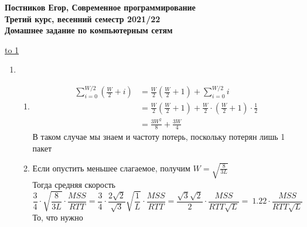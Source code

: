 \documentclass[12pt]{article}
\def\up{\vspace*{-0.3em}}
\def\LINE{\vspace*{-1em}\noindent \underline{\hbox to 1\textwidth{{ } \hfil{ } \hfil{ } }}}
\newenvironment{MyList}[1][4pt]{
  \begin{enumerate}[1.]
  \setlength{\parskip}{0pt}
  \setlength{\itemsep}{#1}
}{       
  \end{enumerate}
}
\begin{document}
\renewcommand{\dateseparator}{--}
\begin{center}
  {\Large\bf 
 	Постников Егор, Современное программирование\\ 	
   Третий курс, весенний семестр 2021/22\\
   Домашнее задание по компьютерным сетям
   }\\
  \vspace{0.5em}
\end{center}

\vspace{-1em}
\LINE
\vspace{1em}

\vspace*{0.5em}

\up

\begin{MyList}
	\item \begin{enumerate}
		\item \begin{align*}
			\sum_{i = 0}^{W / 2} \left(\frac{W}{2} + i\right) 
			&= \frac{W}{2}\left(\frac{W}{2} + 1\right) + \sum_{i = 0}^{W / 2} i \\
			&= \frac{W}{2}\left(\frac{W}{2} + 1\right) + \frac{W}{2}\cdot \left(\frac{W}{2} + 1\right) \cdot \frac{1}{2} \\
			&= \frac{3W^2}{8} + \frac{3W}{4}
		\end{align*}
		В таком случае мы знаем и частоту потерь, поскольку потерян лишь 1 пакет
		\item Если опустить меньшее слагаемое, получим $W = \sqrt{\frac{8}{3L}}$\\
		Тогда средняя скорость $$\frac{3}{4}\cdot \sqrt{\frac{8}{3L}} \cdot \frac{MSS}{RTT} 
		= \frac{3}{4}\cdot \frac{2\sqrt 2}{\sqrt 3}\sqrt{\frac{1}{L}} \cdot \frac{MSS}{RTT} 
		= \frac{\sqrt 3\sqrt 2}{2}\cdot \frac{MSS}{RTT\sqrt{L}} = ~1.22\cdot \frac{MSS}{RTT\sqrt{L}}$$
		То, что нужно
	\end{enumerate}
\end{MyList}
\end{document}
